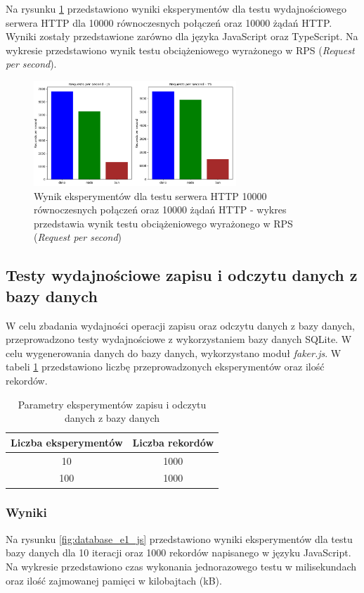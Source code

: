 Na rysunku \ref{fig:server_e3} przedstawiono wyniki eksperymentów dla testu wydajnościowego serwera HTTP dla 10000 równoczesnych połączeń oraz 10000 żądań HTTP. Wyniki zostały przedstawione zarówno dla języka JavaScript oraz TypeScript. Na wykresie przedstawiono wynik testu obciążeniowego wyrażonego w RPS (\textit{Request per second}).

\begin{figure}[H]
  \centering
  \includegraphics[width=0.68\textwidth]{Figures/server/server_1000_10000.png}
  \caption{Wynik eksperymentów dla testu serwera HTTP 10000 równoczesnych połączeń oraz 10000 żądań HTTP - wykres przedstawia wynik testu obciążeniowego wyrażonego w RPS (\textit{Request per second})}
  \label{fig:server_e3}
\end{figure}

\subsection{Testy wydajnościowe zapisu i odczytu danych z bazy danych}
W celu zbadania wydajności operacji zapisu oraz odczytu danych z bazy danych, przeprowadzono testy wydajnościowe z wykorzystaniem bazy danych SQLite. W celu wygenerowania danych do bazy danych, wykorzystano moduł \textit{faker.js}. W tabeli \ref{tab:database_experiments} przedstawiono liczbę przeprowadzonych eksperymentów oraz ilość rekordów.

\begin{table}[H]
  \centering
  \caption{Parametry eksperymentów zapisu i odczytu danych z bazy danych}
  \begin{tabular}{|c|c|}
    \hline
    \textbf{Liczba eksperymentów} & \textbf{Liczba rekordów}\\ \hline
    10 & 1000 \\ \hline
    100 & 1000 \\ \hline
  \end{tabular}
  \label{tab:database_experiments}
\end{table}

\subsubsection{Wyniki}
Na rysunku \ref{fig:database_e1_js} przedstawiono wyniki eksperymentów dla testu bazy danych dla 10 iteracji oraz 1000 rekordów napisanego w języku JavaScript. Na wykresie przedstawiono czas wykonania jednorazowego testu w milisekundach oraz ilość zajmowanej pamięci w kilobajtach (kB).


